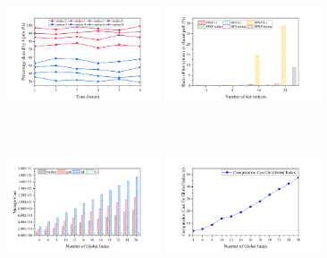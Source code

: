 \documentclass[lettersize,journal]{IEEEtran} %
\begin{document}
\begin{figure}[htbp]
	\begin{minipage}[t]{0.50\linewidth} %
		\centering
		\includegraphics[width=1.8in, height=1.2in]{figure_1.png} %
		\setlength{\abovecaptionskip}{-0.55cm} %
    \captionsetup{labelsep=period}
		\caption{} %
		\label{fig1} %
	\end{minipage}%
	\begin{minipage}[t]{0.50\linewidth}
		\centering
		\includegraphics[width=1.8in, height=1.2in]{figure_2.png}
		\setlength{\abovecaptionskip}{-0.55cm} 
    \captionsetup{labelsep=period}
		\caption{}
		\label{fig2}
	\end{minipage}%
	\\
	\begin{minipage}[t]{0.50\linewidth} %
		\centering
		\includegraphics[width=1.8in, height=1.2in]{figure_3.png} %
		\setlength{\abovecaptionskip}{-0.55cm} 
    \captionsetup{labelsep=period}
		\caption{} %
		\label{fig3} %
	\end{minipage}%
	\begin{minipage}[t]{0.50\linewidth}
		\centering
		\includegraphics[width=1.8in, height=1.2in]{figure_4.png}

\end{minipage}
\end{figure}
\end{document}

